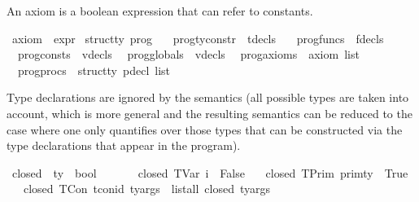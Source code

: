 \begin{isabellebody}
\begin{isamarkuptext}%
An axiom is a boolean expression that can refer to constants.%
\end{isamarkuptext}\isamarkuptrue%
\isamarkupfalse%
\ axiom\ {\isacharequal}{\kern0pt}\ expr\isanewline
\isanewline
{}\isamarkupfalse%
\ {\isacharprime}{\kern0pt}struct{\isacharunderscore}{\kern0pt}ty\ prog\ {\isacharequal}{\kern0pt}\isanewline
\ \ prog{\isacharunderscore}{\kern0pt}ty{\isacharunderscore}{\kern0pt}constr\ {\isacharcolon}{\kern0pt}{\isacharcolon}{\kern0pt}\ tdecls\ \isanewline
\ \ prog{\isacharunderscore}{\kern0pt}funcs\ {\isacharcolon}{\kern0pt}{\isacharcolon}{\kern0pt}\ fdecls\isanewline
\ \ prog{\isacharunderscore}{\kern0pt}consts\ {\isacharcolon}{\kern0pt}{\isacharcolon}{\kern0pt}\ vdecls\isanewline
\ \ prog{\isacharunderscore}{\kern0pt}globals\ {\isacharcolon}{\kern0pt}{\isacharcolon}{\kern0pt}\ vdecls\isanewline
\ \ prog{\isacharunderscore}{\kern0pt}axioms\ {\isacharcolon}{\kern0pt}{\isacharcolon}{\kern0pt}\ {\isachardoublequoteopen}axiom\ list{\isachardoublequoteclose}\isanewline
\ \ prog{\isacharunderscore}{\kern0pt}procs\ {\isacharcolon}{\kern0pt}{\isacharcolon}{\kern0pt}\ {\isachardoublequoteopen}{\isacharprime}{\kern0pt}struct{\isacharunderscore}{\kern0pt}ty\ pdecl\ list{\isachardoublequoteclose}%
\begin{isamarkuptext}%
Type declarations are ignored by the semantics (all possible types are taken into account, which
is more general and the resulting semantics can be reduced to the case where one only quantifies over 
those types that can be constructed via the type declarations that appear in the program).%
\end{isamarkuptext}\isamarkuptrue%
\isamarkupfalse%
\ closed\ {\isacharcolon}{\kern0pt}{\isacharcolon}{\kern0pt}\ {\isachardoublequoteopen}ty\ {\isasymRightarrow}\ bool{\isachardoublequoteclose}\isanewline
\ \ \isanewline
\ \ \ \ {\isachardoublequoteopen}closed\ {\isacharparenleft}{\kern0pt}TVar\ i{\isacharparenright}{\kern0pt}\ {\isacharequal}{\kern0pt}\ False{\isachardoublequoteclose}\isanewline
\ \ {\isacharbar}{\kern0pt}\ {\isachardoublequoteopen}closed\ {\isacharparenleft}{\kern0pt}TPrim\ prim{\isacharunderscore}{\kern0pt}ty{\isacharparenright}{\kern0pt}\ {\isacharequal}{\kern0pt}\ True{\isachardoublequoteclose}\isanewline
\ \ {\isacharbar}{\kern0pt}\ {\isachardoublequoteopen}closed\ {\isacharparenleft}{\kern0pt}TCon\ tcon{\isacharunderscore}{\kern0pt}id\ ty{\isacharunderscore}{\kern0pt}args{\isacharparenright}{\kern0pt}\ {\isacharequal}{\kern0pt}\ list{\isacharunderscore}{\kern0pt}all\ closed\ ty{\isacharunderscore}{\kern0pt}args{\isachardoublequoteclose}\isanewline

\end{isabellebody}
